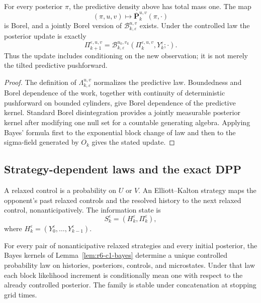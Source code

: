 \begin{lemma}
\label{lem:r6-c1-bayes}
For every posterior \(\pi\), the predictive density above has total mass one.
The map
\[
(\pi,u,v)\longmapsto
\overline{\mathbf P}_{k}^{u,v}(\pi,\cdot)
\]
is Borel, and a jointly Borel version of
\(\mathcal B_{k,\varepsilon}^{u,v}\) exists.  Under the controlled law the
posterior update is exactly
\[
\Pi_{k+1}^{\varepsilon,u,v}
=
\mathcal B_{k,\varepsilon}^{u_k,v_k}
(\Pi_k^{\varepsilon,u,v},Y_k^\varepsilon;\cdot).
\]
Thus the update includes conditioning on the new observation; it is not merely
the tilted predictive pushforward.
\end{lemma}

\begin{proof}
The definition of \(\Lambda_{k,\varepsilon}^{u,v}\) normalizes the predictive
law.  Boundedness and Borel dependence of the work, together with continuity
of deterministic pushforward on bounded cylinders, give Borel dependence of
the predictive kernel.  Standard Borel disintegration provides a jointly
measurable posterior kernel after modifying one null set for a countable
generating algebra.  Applying Bayes' formula first to the exponential block
change of law and then to the sigma-field generated by \(O_k\) gives the
stated update.
\end{proof}

\subsection{Strategy-dependent laws and the exact DPP}

A relaxed control is a probability on \(U\) or \(V\).  An Elliott--Kalton
strategy maps the opponent's past relaxed controls and the resolved history to
the next relaxed control, nonanticipatively.  The information state is
\[
S_k^\varepsilon=(H_k^\varepsilon,\Pi_k^\varepsilon),
\]
where \(H_k^\varepsilon=(Y_0^\varepsilon,\ldots,Y_{k-1}^\varepsilon)\).

\begin{theorem}
\label{thm:r6-c1-law}
For every pair of nonanticipative relaxed strategies and every initial
posterior, the Bayes kernels of Lemma~\ref{lem:r6-c1-bayes} determine a unique
controlled probability law on histories, posteriors, controls, and
microstates.  Under that law each block likelihood increment is conditionally
mean one with respect to the already controlled posterior.  The family is
stable under concatenation at stopping grid times.
\end{theorem}

